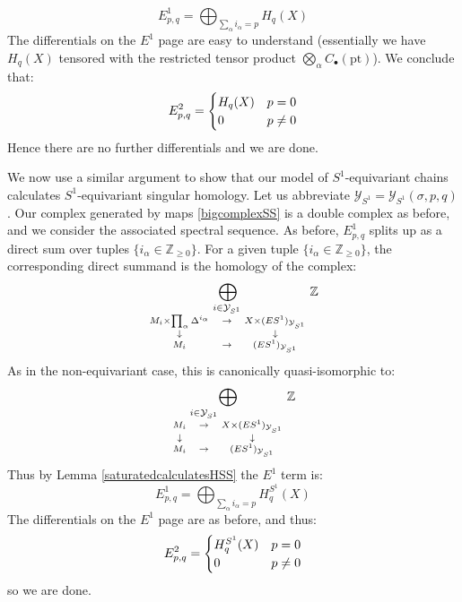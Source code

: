 \documentclass[12pt]{article}
\theoremstyle{definition}
\theoremstyle{remark}
\numberwithin{equation}{subsection}
\newcommand{\Y}{\mathcal Y}
\newcommand{\ZZ}{\mathbb Z}
\newcommand{\pt}{\mathrm{pt}}
\begin{document}
\begin{equation}
E^1_{p,q}=\bigoplus_{\sum_\alpha i_\alpha=p}H_q(X)
\end{equation}
The differentials on the $E^1$ page are easy to understand (essentially we have $H_q(X)$ tensored with the restricted tensor product $\bigotimes_\alpha C_\bullet(\pt)$).  We conclude that:
\begin{equation}
E^2_{p,q}=\begin{cases}H_q(X)&p=0\cr 0&p\ne 0\end{cases}
\end{equation}
Hence there are no further differentials and we are done.

We now use a similar argument to show that our model of $S^1$-equivariant chains calculates $S^1$-equivariant singular homology.  Let us abbreviate $\Y_{S^1}=\Y_{S^1}(\sigma,p,q)$.  Our complex generated by maps \eqref{bigcomplexSS} is a double complex as before, and we consider the associated spectral sequence.  As before, $E^1_{p,q}$ splits up as a direct sum over tuples $\{i_\alpha\in\ZZ_{\geq 0}\}$.  For a given tuple $\{i_\alpha\in\ZZ_{\geq 0}\}$, the corresponding direct summand is the homology of the complex:
\begin{equation}
\bigoplus_{\begin{smallmatrix}&i\in\Y_{S^1}\cr M_i\times\prod_\alpha\Delta^{i_\alpha}&\to&X\times(ES^1)_{\Y_{S^1}}\cr\downarrow&&\downarrow\cr M_i&\to&(ES^1)_{\Y_{S^1}}\end{smallmatrix}}\ZZ
\end{equation}
As in the non-equivariant case, this is canonically quasi-isomorphic to:
\begin{equation}
\bigoplus_{\begin{smallmatrix}&i\in\Y_{S^1}\cr M_i&\to&X\times(ES^1)_{\Y_{S^1}}\cr\downarrow&&\downarrow\cr M_i&\to&(ES^1)_{\Y_{S^1}}\end{smallmatrix}}\ZZ
\end{equation}
Thus by Lemma \ref{saturatedcalculatesHSS} the $E^1$ term is:
\begin{equation}
E^1_{p,q}=\bigoplus_{\sum_\alpha i_\alpha=p}H_q^{S^1}(X)
\end{equation}
The differentials on the $E^1$ page are as before, and thus:
\begin{equation}
E^2_{p,q}=\begin{cases}H_q^{S^1}(X)&p=0\cr 0&p\ne 0\end{cases}
\end{equation}
so we are done.
\end{document}

